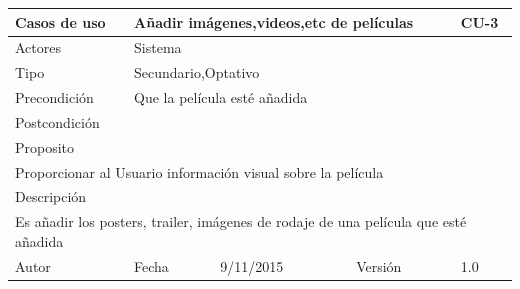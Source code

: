 \documentclass{article}
\begin{document}
\begin{table}[h]
\begin{tabular}{|l|l|l|l|l|l|}
\hline
\multicolumn{2}{|p{2cm}|}{Casos de uso}  & \multicolumn{3}{p{7cm}|}{Añadir imágenes,videos,etc de películas} & CU-3 \\
\hline
\multicolumn{2}{|p{2cm}|}{Actores}       & \multicolumn{4}{p{8cm}|}{Sistema}        \\
\hline
\multicolumn{2}{|p{2cm}|}{Tipo}          & \multicolumn{4}{p{8cm}|}{Secundario,Optativo}        \\
\hline
\multicolumn{2}{|p{2cm}|}{Precondición}  & \multicolumn{4}{p{8cm}|}{Que la película esté añadida}        \\
\hline
\multicolumn{2}{|p{2cm}|}{Postcondición} & \multicolumn{4}{p{8cm}|}{}        \\
\hline
\multicolumn{6}{|p{10cm}|}{Proposito}                                   \\
\hline
\multicolumn{6}{|p{10cm}|}{Proporcionar al Usuario información visual sobre la película }                                            \\
\hline
\multicolumn{6}{|p{10cm}|}{Descripción}                                 \\
\hline
\multicolumn{6}{|p{10cm}|}{Es añadir los posters, trailer, imágenes de rodaje de una película que esté añadida}                                            \\
\hline
Autor              &              & Fecha   & 9/11/2015     &   Versión  &1.0\\
\hline
\end{tabular}
\end{table}
\end{document}
